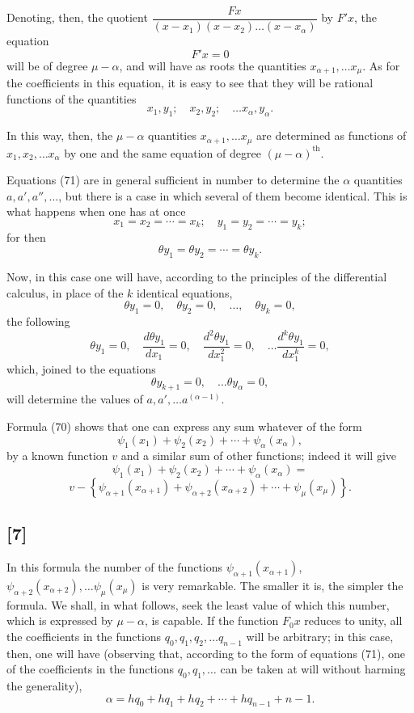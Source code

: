 \documentclass{article}
\begin{document}
Denoting, then, the quotient $\dfrac{F x}{(x-x_1)(x-x_2) \ldots (x-x_\alpha)}$ by $F' x$, the equation
\[ F' x = 0 \tag{72} \]
will be of degree $\mu-\alpha$, and will have as roots the quantities $x_{\alpha+1}, \ldots x_\mu$. As for the coefficients in this equation, it is easy to see that they will be rational functions of the quantities
\[ x_1, y_1; \quad x_2, y_2; \quad \ldots x_\alpha, y_\alpha. \]

In this way, then, the $\mu-\alpha$ quantities $x_{\alpha+1}, \ldots x_\mu$ are determined as functions of $x_1, x_2, \ldots x_\alpha$ by one and the same equation of degree $(\mu-\alpha)^{\text{th}}$.

Equations (71) are in general sufficient in number to determine the $\alpha$ quantities $a, a', a'', \ldots$, but there is a case in which several of them become identical. This is what happens when one has at once
\[ x_1 = x_2 = \cdots = x_k; \quad y_1 = y_2 = \cdots = y_k; \]
for then
\[ \theta y_1 = \theta y_2 = \cdots = \theta y_k. \]

Now, in this case one will have, according to the principles of the differential calculus, in place of the $k$ identical equations,
\[ \theta y_1 = 0, \quad \theta y_2 = 0, \quad \ldots, \quad \theta y_k = 0, \]
the following
\[ \theta y_1 = 0, \quad \frac{d\theta y_1}{dx_1} = 0, \quad \frac{d^{2}\theta y_1}{dx_1^{2}} = 0, \quad \ldots \frac{d^{k}\theta y_1}{dx_1^{k}} = 0, \tag{73} \]
which, joined to the equations
\[ \theta y_{k+1} = 0, \quad \ldots \theta y_\alpha = 0, \]
will determine the values of $a, a', \ldots a^{(\alpha-1)}$.

Formula (70) shows that one can express any sum whatever of the form
\[ \psi_1(x_1) + \psi_2(x_2) + \cdots + \psi_\alpha(x_\alpha), \]
by a known function $v$ and a similar sum of other functions; indeed it will give
\[ \psi_1(x_1) + \psi_2(x_2) + \cdots + \psi_\alpha(x_\alpha) = \]
\[ v - \left\{ \psi_{\alpha+1}(x_{\alpha+1}) + \psi_{\alpha+2}(x_{\alpha+2}) + \cdots + \psi_\mu(x_\mu) \right\}. \tag{74} \]

\subsection*{[7]}

In this formula the number of the functions $\psi_{\alpha+1}(x_{\alpha+1})$, $\psi_{\alpha+2}(x_{\alpha+2}), \ldots \psi_\mu(x_\mu)$ is very remarkable. The smaller it is, the simpler the formula. We shall, in what follows, seek the least value of which this number, which is expressed by $\mu-\alpha$, is capable.
If the function $F_0 x$ reduces to unity, all the coefficients in the functions $q_0, q_1, q_2, \ldots q_{n-1}$ will be arbitrary; in this case, then, one will have (observing that, according to the form of equations (71), one of the coefficients in the functions $q_0, q_1, \ldots$ can be taken at will without harming the generality),
\[ \alpha = hq_0 + hq_1 + hq_2 + \cdots + hq_{n-1} + n - 1. \]
\end{document}
